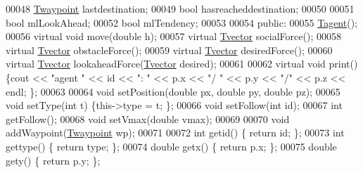 \begin{DoxyCode}
00048                 \hyperlink{classPed_1_1Twaypoint}{Twaypoint} lastdestination;                        
00049                 \textcolor{keywordtype}{bool} hasreacheddestination;                       
00050 
00051                 \textcolor{keywordtype}{bool} mlLookAhead;
00052                 \textcolor{keywordtype}{bool} mlTendency;
00053                 
00054         \textcolor{keyword}{public}:
00055                 \hyperlink{classPed_1_1Tagent}{Tagent}(); 
00056                 \textcolor{keyword}{virtual} \textcolor{keywordtype}{void} move(\textcolor{keywordtype}{double} h);                      
00057                 \textcolor{keyword}{virtual} \hyperlink{classPed_1_1Tvector}{Tvector} socialForce();
00058                 \textcolor{keyword}{virtual} \hyperlink{classPed_1_1Tvector}{Tvector} obstacleForce();
00059                 \textcolor{keyword}{virtual} \hyperlink{classPed_1_1Tvector}{Tvector} desiredForce();
00060                 \textcolor{keyword}{virtual} \hyperlink{classPed_1_1Tvector}{Tvector} lookaheadForce(\hyperlink{classPed_1_1Tvector}{Tvector} desired);
00061 
00062                 \textcolor{keyword}{virtual} \textcolor{keywordtype}{void} print() \{cout << \textcolor{stringliteral}{"agent "} << \textcolor{keywordtype}{id} << \textcolor{stringliteral}{": "} << p.x << \textcolor{stringliteral}{"/
      "} << p.y << \textcolor{stringliteral}{"/"} << p.z << endl; \}; 
00063                 
00064                 \textcolor{keywordtype}{void} setPosition(\textcolor{keywordtype}{double} px, \textcolor{keywordtype}{double} py, \textcolor{keywordtype}{double} pz);
00065                 \textcolor{keywordtype}{void} setType(\textcolor{keywordtype}{int} t) \{this->type = t; \};           
00066                 \textcolor{keywordtype}{void} setFollow(\textcolor{keywordtype}{int} \textcolor{keywordtype}{id});
00067                 \textcolor{keywordtype}{int} getFollow();
00068                 \textcolor{keywordtype}{void} setVmax(\textcolor{keywordtype}{double} vmax);
00069                 
00070                 \textcolor{keywordtype}{void} addWaypoint(\hyperlink{classPed_1_1Twaypoint}{Twaypoint} wp);
00071                 
00072                 \textcolor{keywordtype}{int} getid() \{ \textcolor{keywordflow}{return} id; \};                       
00073                 \textcolor{keywordtype}{int} gettype() \{ \textcolor{keywordflow}{return} type; \};                   
00074                 \textcolor{keywordtype}{double} getx() \{ \textcolor{keywordflow}{return} p.x; \};                    
00075                 \textcolor{keywordtype}{double} gety() \{ \textcolor{keywordflow}{return} p.y; \};                    

\end{DoxyCode}
